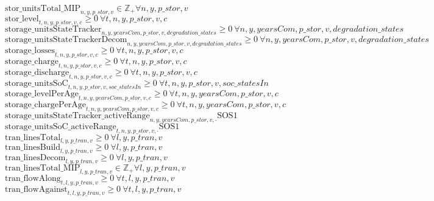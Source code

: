\documentclass[11pt]{article}
\begin{document}
$\text{stor\_unitsTotal\_MIP}_{n, y, p\_stor, v}\in \mathbb{Z}_{+} \forall n, y, p\_stor, v$ \newline 
$\text{stor\_level}_{t, n, y, p\_stor, v, c}\geq 0 ~ \forall t, n, y, p\_stor, v, c$ \newline 
$\text{storage\_unitsStateTracker}_{n, y, yearsCom, p\_stor, v, degradation\_states}\geq 0 ~ \forall n, y, yearsCom, p\_stor, v, degradation\_states$ \newline 
$\text{storage\_unitsStateTrackerDecom}_{n, y, yearsCom, p\_stor, v, degradation\_states}\geq 0 ~ \forall n, y, yearsCom, p\_stor, v, degradation\_states$ \newline 
$\text{storage\_losses}_{t, n, y, p\_stor, v, c}\geq 0 ~ \forall t, n, y, p\_stor, v, c$ \newline 
$\text{storage\_charge}_{t, n, y, p\_stor, v, c}\geq 0 ~ \forall t, n, y, p\_stor, v, c$ \newline 
$\text{storage\_discharge}_{t, n, y, p\_stor, v, c}\geq 0 ~ \forall t, n, y, p\_stor, v, c$ \newline 
$\text{storage\_unitsSoC}_{t, n, y, p\_stor, v, soc\_statesIn}\geq 0 ~ \forall t, n, y, p\_stor, v, soc\_statesIn$ \newline 
$\text{storage\_levelPerAge}_{t, n, y, yearsCom, p\_stor, v, c}\geq 0 ~ \forall t, n, y, yearsCom, p\_stor, v, c$ \newline 
$\text{storage\_chargePerAge}_{t, n, y, yearsCom, p\_stor, v, c}\geq 0 ~ \forall t, n, y, yearsCom, p\_stor, v, c$ \newline 
$\text{storage\_unitsStateTracker\_activeRange}_{n, y, yearsCom, p\_stor, v, \cdot}\text{SOS1}$ \newline 
$\text{storage\_unitsSoC\_activeRange}_{t, n, y, p\_stor, v, \cdot}\text{SOS1}$ \newline 
$\text{tran\_linesTotal}_{l, y, p\_tran, v}\geq 0 ~ \forall l, y, p\_tran, v$ \newline 
$\text{tran\_linesBuild}_{l, y, p\_tran, v}\geq 0 ~ \forall l, y, p\_tran, v$ \newline 
$\text{tran\_linesDecom}_{l, y, p\_tran, v}\geq 0 ~ \forall l, y, p\_tran, v$ \newline 
$\text{tran\_linesTotal\_MIP}_{l, y, p\_tran, v}\in \mathbb{Z}_{+} \forall l, y, p\_tran, v$ \newline 
$\text{tran\_flowAlong}_{t, l, y, p\_tran, v}\geq 0 ~ \forall t, l, y, p\_tran, v$ \newline 
$\text{tran\_flowAgainst}_{t, l, y, p\_tran, v}\geq 0 ~ \forall t, l, y, p\_tran, v$ \newline
\bigskip
\end{document}
